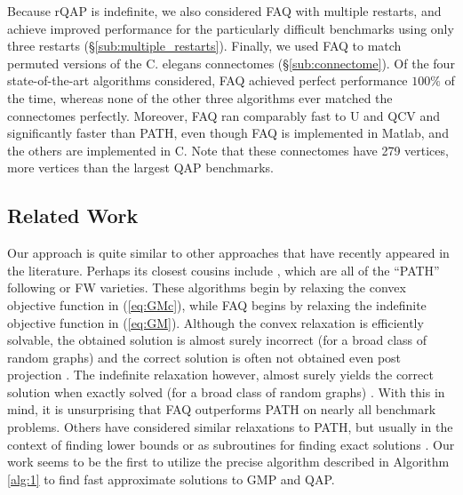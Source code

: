 \documentclass[10pt]{article}
\begin{document}
Because rQAP is indefinite, we also considered FAQ with multiple restarts, and achieve improved performance for the particularly difficult benchmarks using only three restarts (\S \ref{sub:multiple_restarts}).    
Finally, we used FAQ to match permuted versions of the C. elegans connectomes (\S \ref{sub:connectome}). Of the four state-of-the-art algorithms considered, FAQ achieved perfect performance $100\%$ of the time, whereas none of the other three algorithms ever matched the connectomes perfectly.  Moreover, FAQ ran comparably fast to U and QCV and significantly faster than PATH, even though FAQ is implemented in Matlab, and the others are implemented in C.  Note that these connectomes have 279 vertices, more vertices than the largest QAP benchmarks. 



\subsection{Related Work}

Our approach is quite similar to other approaches that have recently appeared in the literature.  Perhaps its closest cousins include \cite{Zaslavskiy2009, Zaslavskiy2010,otherFW,Escolano2011}, which are all of the ``PATH'' following or FW varieties.  These algorithms begin by relaxing the convex objective function in (\ref{eq:GMc}), while FAQ begins by relaxing the indefinite objective function in (\ref{eq:GM}). 
Although the convex relaxation is efficiently solvable, the obtained solution is almost surely incorrect (for a broad class of random graphs)
 and the correct solution is often not obtained even post projection \cite{lyzinski2014graph}.  The indefinite relaxation however, almost surely yields the correct solution when exactly solved (for a broad class of random graphs) 
 \cite{lyzinski2014graph}.  %
With this in mind, it is unsurprising that FAQ outperforms PATH on nearly all benchmark problems.  
Others have considered similar relaxations to PATH, but usually in the context of finding lower bounds  \cite{Anstreicher2001} or as subroutines for finding exact solutions \cite{Brixius2000}.  Our work seems to be the first to utilize the precise algorithm described in Algorithm \ref{alg:1} to find fast approximate solutions to GMP and QAP.
\end{document}
